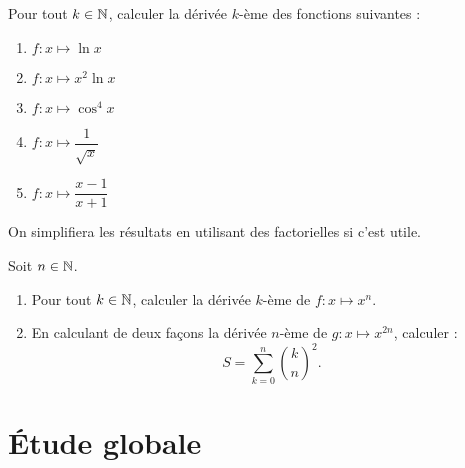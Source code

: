 \begin{corr}
\end{corr}

\begin{exo}[Exercice 4]
Pour tout \(k\in\mathbb{N}\), calculer la dérivée \(k\)-ème des fonctions suivantes :

\begin{enumerate}
\item \(f:x\mapsto\ln x\) \\

\item \(f:x\mapsto x^2\ln x\) \\

\item \(f:x\mapsto\cos^4x\) \\

\item \(f:x\mapsto\dfrac{1}{\sqrt{x}}\) \\

\item \(f:x\mapsto\dfrac{x-1}{x+1}\)
\end{enumerate}

On simplifiera les résultats en utilisant des factorielles si c'est utile.
\end{exo}

\begin{corr}
\end{corr}

\begin{exo}[Exercice 5]
Soit \(n\in\mathbb{N}\).

\begin{enumerate}
\item Pour tout \(k\in\mathbb{N}\), calculer la dérivée \(k\)-ème de \(f:x\mapsto x^n\). \\

\item En calculant de deux façons la dérivée \(n\)-ème de \(g:x\mapsto x^{2n}\), calculer : \[S=\sum_{k=0}^n\binom{k}{n}^2.\]
\end{enumerate}
\end{exo}

\begin{corr}
\end{corr}

\section{Étude globale}

